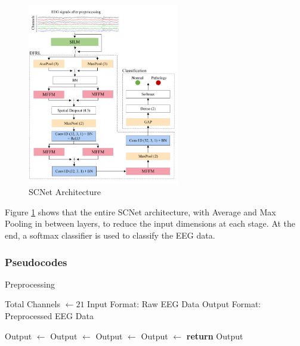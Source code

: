 \documentclass[10pt]{article}
\begin{document}
\begin{figure}[H]
    \centering
    \includegraphics[width=0.59\textwidth]{model.png}
    \caption{SCNet Architecture}
    \label{fig:model}
\end{figure}
Figure \ref{fig:model} shows that the entire SCNet architecture, with Average and Max Pooling in between layers, to reduce the input dimensions at each stage. At the end, a softmax classifier is used to classify the EEG data.

\subsubsection{Pseudocodes}

\begin{algorithm}[H]
  \caption{Preprocessing}
      \begin{algorithmic}[1]
       
          \State Total Channels $\gets 21$
          \State Input Format: Raw EEG Data
          \State 
          \State Output Format: Preprocessed EEG Data
          \State
  
          \State Output $\gets$  
          \State Output $\gets$  
          \State Output $\gets$  
          \State Output $\gets$  
          \State \textbf{return} Output  
      \EndProcedure
      \end{algorithmic}
  \end{algorithm}
\end{document}
